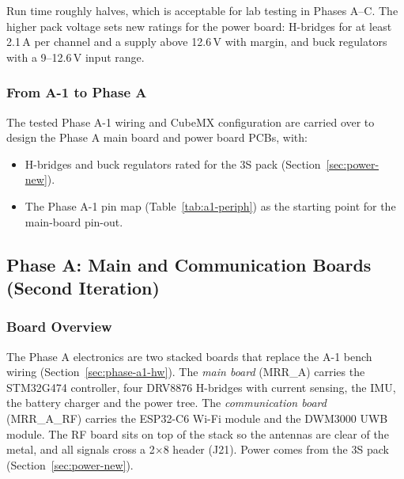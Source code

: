\documentclass[12pt,a4paper]{article}
\begin{document}
Run time roughly halves, which is acceptable for lab testing in Phases A--C.
The higher pack voltage sets new ratings for the power board: H-bridges for at
least 2.1\,A per channel and a supply above 12.6\,V with margin, and buck
regulators with a 9--12.6\,V input range.

\subsubsection{From A-1 to Phase A}
\label{sec:elec-next}

The tested Phase A-1 wiring and CubeMX configuration are carried over to
design the Phase A main board and power board PCBs, with:
\begin{itemize}
  \item H-bridges and buck regulators rated for the 3S pack
        (Section~\ref{sec:power-new}).
  \item The Phase A-1 pin map (Table~\ref{tab:a1-periph}) as the starting
        point for the main-board pin-out.
\end{itemize}

\subsection{Phase A: Main and Communication Boards (Second Iteration)}
\label{sec:phase-a-board}

\subsubsection{Board Overview}

The Phase A electronics are two stacked boards that replace the A-1 bench
wiring (Section~\ref{sec:phase-a1-hw}). The \emph{main board} (MRR\_A) carries
the STM32G474 controller, four DRV8876 H-bridges with current sensing, the IMU,
the battery charger and the power tree. The \emph{communication board}
(MRR\_A\_RF) carries the ESP32-C6 Wi-Fi module and the DWM3000 UWB module. The
RF board sits on top of the stack so the antennas are clear of the metal, and
all signals cross a 2$\times$8 header (J21). Power comes from the 3S pack
(Section~\ref{sec:power-new}).
\end{document}

